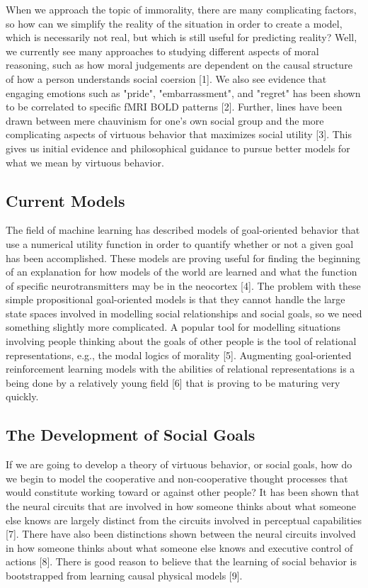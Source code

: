 When we approach the topic of immorality, there are many complicating
factors, so how can we simplify the reality of the situation in order
to create a model, which is necessarily not real, but which is still
useful for predicting reality? Well, we currently see many approaches
to studying different aspects of moral reasoning, such as how moral
judgements are dependent on the causal structure of how a person
understands social coersion [1]. We also see evidence that engaging
emotions such as "pride", "embarrassment", and "regret" has been shown
to be correlated to specific fMRI BOLD patterns [2]. Further, lines
have been drawn between mere chauvinism for one's own social group and
the more complicating aspects of virtuous behavior that maximizes
social utility [3]. This gives us initial evidence and philosophical
guidance to pursue better models for what we mean by virtuous
behavior.

\subsection{Current Models}

The field of machine learning has described models of goal-oriented
behavior that use a numerical utility function in order to quantify
whether or not a given goal has been accomplished. These models are
proving useful for finding the beginning of an explanation for how
models of the world are learned and what the function of specific
neurotransmitters may be in the neocortex [4]. The problem with these
simple propositional goal-oriented models is that they cannot handle
the large state spaces involved in modelling social relationships and
social goals, so we need something slightly more complicated. A
popular tool for modelling situations involving people thinking about
the goals of other people is the tool of relational representations,
e.g., the modal logics of morality [5]. Augmenting goal-oriented
reinforcement learning models with the abilities of relational
representations is a being done by a relatively young field [6] that
is proving to be maturing very quickly.

\subsection{The Development of Social Goals}

If we are going to develop a theory of virtuous behavior, or social
goals, how do we begin to model the cooperative and non-cooperative
thought processes that would constitute working toward or against
other people? It has been shown that the neural circuits that are
involved in how someone thinks about what someone else knows are
largely distinct from the circuits involved in perceptual capabilities
[7]. There have also been distinctions shown between the neural
circuits involved in how someone thinks about what someone else knows
and executive control of actions [8]. There is good reason to believe
that the learning of social behavior is bootstrapped from learning
causal physical models [9].


